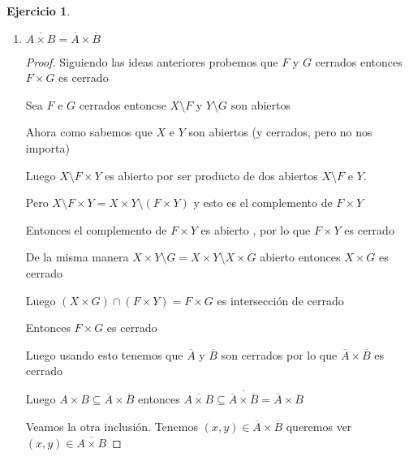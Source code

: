 \documentclass[11pt]{report}
\newcommand{\ol}{\overline}
\newcommand{\open}{\mathrm{o}}
\theoremstyle{definition}
\newtheorem{ej}{Ejercicio}
\begin{document}
\begin{ej}
\begin{enumerate}
\begin{proof}
	Veamos $A^{\open} \times B^{\open} \supseteq (A \times B)^{\open}$

	Sea $(x,y) \in (A \times B)^{\open}$ entonces existe $r>0 \quad B_{r}(x,y) \subseteq (A \times B)$

	Entonces si $x' \in B(x,\frac{r}{2})$ e $y' \in B(y,\frac{r}{2})$

	Luego $d((x',y')(x,y)) = d_{1}(x',x) + d_{2}(y',y) < \frac{r}{2} + \frac{r}{2} = r$

	entonces $(x',y') \in B_{r}(x,y) \subseteq A \times B$

	Luego $x' \in A$ y tambien $y' \in B$

	Por lo tanto $B(x,\frac{r}{2}) \subseteq A$ y por otro lado $B(y,\frac{r}{2}) \subseteq B$

	Entonces $x \in A^{\open}$ e $y \in B^{\open}$ luego $(x,y) \in A^{\open} \times B^{\open}$  
      \end{proof}
    \item $\ol{A\times B} = \ol{A} \times \ol{B}$
      \begin{proof}
	Siguiendo las ideas anteriores probemos que $F$ y $G$ cerrados entonces $F \times G$ es cerrado

	Sea $F$ e $ G$ cerrados entoncse $X \setminus F$ y $Y \setminus G$ son abiertos 

	Ahora como sabemos que $X$ e $Y$ son abiertos (y cerrados, pero no nos importa)

	Luego $X\setminus F \times Y  $ es abierto por ser producto de dos abiertos $X\setminus F$ e $Y$.

	Pero $ X\setminus F \times Y = X \times Y \setminus (F \times Y) $ y esto es el complemento de $F \times Y$

	Entonces el complemento de $F \times Y$ es abierto , por lo que $F \times Y$ es cerrado

	De la misma manera $X \times Y \setminus G = X \times Y \setminus X \times G$ abierto entonces $X \times G$ es cerrado

	Luego $(X \times G )\cap (F \times Y) = F\times G$ es intersección de cerrado

	Entonces $F \times G$ es cerrado

	Luego usando esto tenemos que $\ol A$ y $\ol B$ son cerrados por lo que $\ol A \times \ol B$ es cerrado

	Luego $A \times B \subseteq \ol A \times \ol B$ entonces $\ol{A \times B} \subseteq \ol{\ol A \times \ol B} = \ol A \times \ol B$

	Veamos la otra inclusión. Tenemos $(x,y) \in \ol A \times \ol B$ queremos ver $(x,y) \in \ol{A \times B}$


\end{proof}
\end{enumerate}
\end{ej}
\end{document}
